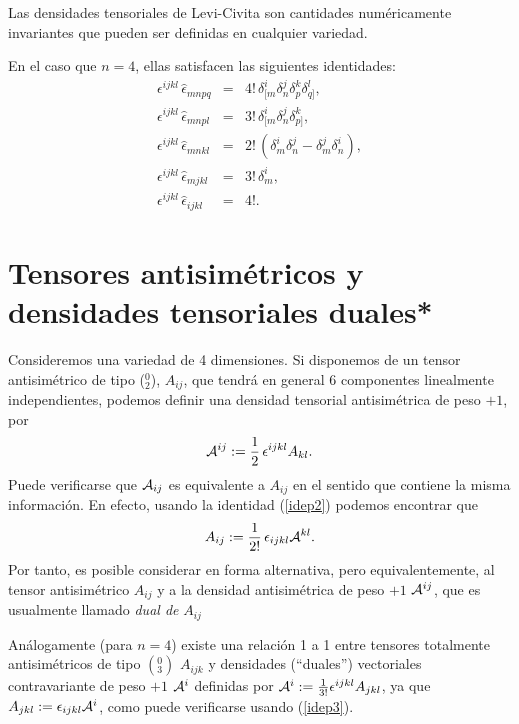  Las densidades tensoriales de Levi-Civita son cantidades numéricamente
 invariantes que pueden ser definidas en cualquier variedad.


 En el caso que $n=4$, ellas satisfacen las siguientes identidades:
 \begin{eqnarray}
 \epsilon^{ijkl}\, \hat{\epsilon}_{mnpq}&=&4!\, \delta^i_{[m}\delta^j_n
 \delta^k_p \delta^l_{q]}, \\
 \epsilon^{ijkl}\, \hat{\epsilon}_{mnpl}&=&3!\, \delta^i_{[m}\delta^j_n
 \delta^k_{p]} , \\
 \epsilon^{ijkl}\, \hat{\epsilon}_{mnkl}&=&2!\, \left( \delta^i_m\delta^j_n -
 \delta^j_m \delta^i_n\right), \label{idep2} \\
 \epsilon^{ijkl}\, \hat{\epsilon}_{mjkl}&=&3!\, \delta^i_m, \label{idep3}\\
 \epsilon^{ijkl}\, \hat{\epsilon}_{ijkl}&=&4! .
 \end{eqnarray}

 \section{Tensores antisimétricos y densidades tensoriales duales*}
 Consideremos una variedad de 4 dimensiones. Si disponemos de un tensor
 antisimétrico de tipo ($_2^0$), $A_{ij}$, que tendrá en general 6
 componentes linealmente independientes, podemos definir una densidad tensorial
 antisimétrica de peso $+1$, por
 \begin{equation}
 {\cal A}^{ij}:=\frac{1}2\,\epsilon^{ijkl}A_{kl} .\label{den13}
 \end{equation}
 Puede verificarse que ${\cal A}_{ij}$ es equivalente a $A_{ij}$ en el sentido
 que contiene la misma información. En efecto, usando la identidad
 (\ref{idep2}) podemos encontrar que
 \begin{equation}
 A_{ij} :=\frac{1}{2!}\,\epsilon_{ijkl}{\cal A}^{kl}.
 \end{equation}
 Por tanto, es posible considerar en forma alternativa, pero equivalentemente,
 al tensor antisimétrico $A_{ij}$ y a la densidad antisimétrica de peso
 $+1$ ${\cal A}^{ij}$, que es usualmente llamado \textit{dual de} $A_{ij}$

 Análogamente (para $n=4$) existe una relación 1 a 1 entre tensores
 totalmente antisimétricos de tipo $(^0_3)$ $A_{ijk}$ y densidades
 (``duales'') vectoriales
 contravariante de peso $+1$ ${\cal A}^i$ definidas por ${\cal
 A}^i:=\frac{1}{3!}\epsilon^{ijkl}A_{jkl}$, ya que
 $A_{jkl}:=\epsilon_{ijkl}{\cal A}^i$, como puede verificarse usando
 (\ref{idep3}).

